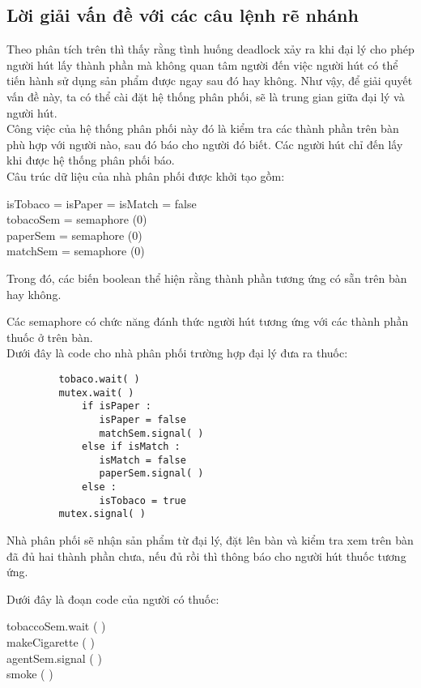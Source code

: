 \documentclass[a4paper]{article}
\begin{document}
	\subsection{Lời giải vấn đề với các câu lệnh rẽ nhánh}
	Theo phân tích trên thì thấy rằng tình huống deadlock xảy ra khi đại lý cho phép người hút
	lấy thành phần mà không quan tâm người đến việc người hút có thể tiến hành sử dụng sản phẩm được ngay sau 
	đó hay không. Như vậy, để giải quyết vấn đề này, 
	ta có thể cài đặt hệ thống phân phối, sẽ là trung gian giữa đại lý và người hút. \\
	Công việc của hệ thống phân phối này đó là kiểm tra các thành phần trên bàn phù hợp với người 
	nào, sau đó báo cho người đó biết. Các người hút chỉ đến lấy khi được hệ thống phân phối báo. \\
	Câu trúc dữ liệu của nhà phân phối được khởi tạo gồm: 
	\begin{tcolorbox}
	isTobaco = isPaper = isMatch = false \\
	tobacoSem = semaphore (0) \\
	paperSem = semaphore (0) \\
	matchSem = semaphore (0)
	\end{tcolorbox}
	Trong đó, các biến boolean thể hiện rằng thành phần tương ứng có sẵn trên bàn hay không. 
	
	
	\hspace{4mm}Các semaphore có chức năng đánh thức người hút tương ứng với các thành phần thuốc ở trên bàn. \\
	Dưới đây là code cho nhà phân phối trường hợp đại lý đưa ra thuốc:
	\begin{tcolorbox}
		\begin{verbatim}
		 tobaco.wait( )
		 mutex.wait( ) 
		     if isPaper : 
		        isPaper = false
		        matchSem.signal( )
		     else if isMatch : 
		        isMatch = false
		        paperSem.signal( )
		     else :
		        isTobaco = true
		 mutex.signal( )
		\end{verbatim}
	\end{tcolorbox}

	Nhà phân phối sẽ nhận sản phẩm từ đại lý, đặt lên bàn và kiểm 
	tra xem trên bàn đã đủ hai thành phần chưa, nếu đủ rồi thì thông báo cho người hút thuốc tương ứng.

	Dưới đây là đoạn code của người có thuốc:

	\begin{tcolorbox}
		tobaccoSem.wait ( ) \\
		makeCigarette ( ) \\ 
		agentSem.signal ( ) \\
		smoke ( )
	\end{tcolorbox}
	
\end{document}

